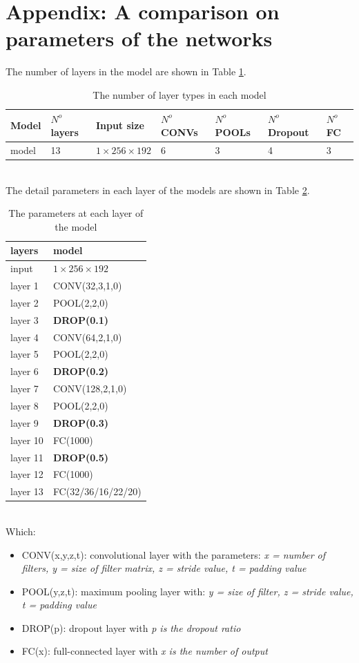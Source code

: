 \documentclass[12pt,a4paper]{article}
\begin{document}
\section{Appendix: A comparison on parameters of the networks}
The number of layers in the model are shown in Table \ref{numlayers}.
\begin{table}[h!]
	\centering
	\begin{tabular}{l p{1.2cm} p{3cm} p{2cm} p{1.2cm} p{2cm} p{2cm}}
		Model & $N^o$ layers & Input size & $N^o$ CONVs & $N^o$ POOLs & $N^o$ Dropout & $N^o$ FC \\ \hline
		model & 13 & $1 \times 256 \times 192$ & 6 & 3 & 4 & 3 \\ \hline
	\end{tabular}
	\caption{The number of layer types in each model}
	\label{numlayers}
\end{table}~\\
The detail parameters in each layer of the models are shown in Table \ref{modelparameters}.
\begin{table}[h!]
	\centering
	\begin{tabular}{l p{3cm} }
		layers &  model  \\ \hline
		input & $1 \times 256 \times 192$ \\ \hline
 		layer 1 & CONV(32,3,1,0) \\ \hline
		layer 2 & POOL(2,2,0) \\ \hline
		layer 3 & \textbf{DROP(0.1)} \\ \hline
		layer 4 & CONV(64,2,1,0) \\ \hline
		layer 5 & POOL(2,2,0) \\ \hline
		layer 6 & \textbf{DROP(0.2)} \\ \hline
		layer 7 & CONV(128,2,1,0) \\ \hline
		layer 8 & POOL(2,2,0) \\ \hline
		layer 9 & \textbf{DROP(0.3)} \\ \hline
		layer 10 & FC(1000) \\ \hline
		layer 11 & \textbf{DROP(0.5)} \\ \hline
		layer 12& FC(1000) \\ \hline
		layer 13 & FC(32/36/16/22/20) \\ \hline
	\end{tabular}
	\caption{The parameters at each layer of the model}
	\label{modelparameters}
\end{table}~\\
Which:
\begin{itemize}
	\item CONV(x,y,z,t): convolutional layer with the parameters: \textit{x = number of filters, y = size of filter matrix, z = stride value, t = padding value}
	\item POOL(y,z,t): maximum pooling layer with: \textit{y = size of filter, z = stride value, t = padding value}
	\item DROP(p): dropout layer with \textit{p is the dropout ratio}
	\item FC(x): full-connected layer with \textit{x is the number of output}
\end{itemize}
\end{document}
